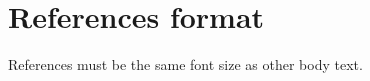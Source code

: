 \documentclass{sigchi}
\begin{document}
%
%
%
%
%
\balance

\section{References format}
References must be the same font size as other body text.



\end{document}
